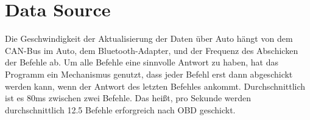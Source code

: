 \documentclass[qualitaetssicherung.tex]{subfiles}
\begin{document}
\section{Data Source}
Die Geschwindigkeit der Aktualisierung der Daten über Auto hängt von dem CAN-Bus
im Auto, dem Bluetooth-Adapter, und der Frequenz des Abschicken der Befehle ab.
Um alle Befehle eine sinnvolle Antwort zu haben, hat das Programm ein
Mechanismus genutzt, dass jeder Befehl erst dann abgeschickt werden kann, wenn der
Antwort des letzten Befehles ankommt. Durchschnittlich ist es 80ms zwischen zwei
Befehle. Das heißt, pro Sekunde werden durchschnittlich 12.5 Befehle erforgreich
nach OBD geschickt.
\end{document}
